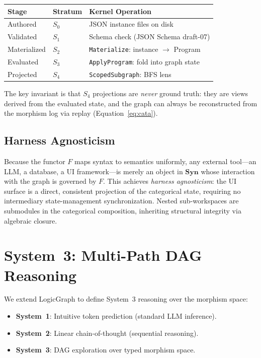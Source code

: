 \documentclass[submission,copyright,creativecommons]{eptcs}
\begin{document}
\begin{center}
\begin{tabular}{@{}lll@{}}
\toprule
Stage & Stratum & Kernel Operation \\
\midrule
Authored   & $S_0$ & JSON instance files on disk \\
Validated  & $S_1$ & Schema check (JSON Schema draft-07) \\
Materialized & $S_2$ & \texttt{Materialize}: instance $\to$ Program \\
Evaluated  & $S_3$ & \texttt{ApplyProgram}: fold into graph state \\
Projected  & $S_4$ & \texttt{ScopedSubgraph}: BFS lens \\
\bottomrule
\end{tabular}
\end{center}

The key invariant is that $S_4$ projections are \emph{never} ground truth:
they are views derived from the evaluated state, and the graph can always be
reconstructed from the morphism log via replay (Equation~\ref{eq:cata}).

\subsection{Harness Agnosticism}

Because the functor $F$ maps syntax to semantics uniformly, any external
tool---an LLM, a database, a UI framework---is merely an object in
$\mathbf{Syn}$ whose interaction with the graph is governed by $F$. This
achieves \emph{harness agnosticism}: the UI surface is a direct, consistent
projection of the categorical state, requiring no intermediary state-management
synchronization. Nested sub-workspaces are submodules in the categorical
composition, inheriting structural integrity via algebraic closure.

\section{System~3: Multi-Path DAG Reasoning}
\label{sec:system3}

We extend LogicGraph \cite{logicgraph2025} to define System~3 reasoning over
the morphism space:

\begin{itemize}
  \item \textbf{System~1}: Intuitive token prediction (standard LLM inference).
  \item \textbf{System~2}: Linear chain-of-thought (sequential reasoning).
  \item \textbf{System~3}: DAG exploration over typed morphism space.
\end{itemize}
\end{document}
